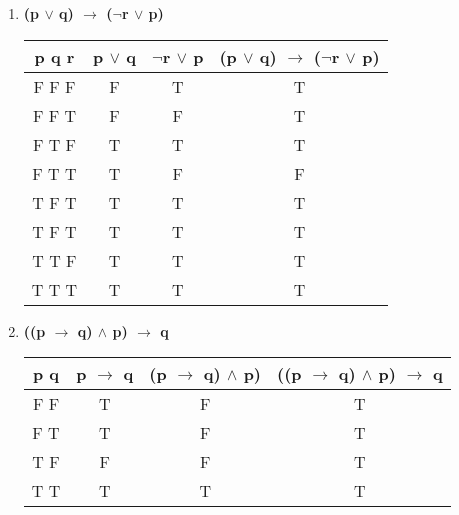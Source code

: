 \documentclass[11pt]{article}
\begin{document}
\begin{enumerate}
\begin{enumerate}[label=(\alph*)]
\item %
\textbf{(p $\lor$ q) $\to$ ($\lnot$r $\lor$ p)} \\
    \begin{tabular}{c|c|c|c}
        \textbf{p q r} & \textbf{p $\lor$ q} & \textbf{$\lnot$r $\lor$ p} & \textbf{(p $\lor$ q) $\to$ ($\lnot$r $\lor$ p)} \\
        \hline
        F F F & F & T & T \\
        F F T & F & F & T \\ 
        \hline
        F T F & T & T & T \\
        F T T & T & F & F \\
        \hline
        T F T & T & T & T \\
        T F T & T & T & T \\
        \hline
        T T F & T & T & T \\
        T T T & T & T & T \\
    \end{tabular}

\item %
\textbf{((p $\to$ q) $\land$ p) $\to$ q} \\
    \begin{tabular}{c|c|c|c}
        \textbf{p q} & \textbf{p $\to$ q} & \textbf{(p $\to$ q) $\land$ p)} & \textbf{((p $\to$ q) $\land$ p) $\to$ q} \\
        \hline
        F F & T & F & T \\
        F T & T & F & T \\
        \hline
        T F & F & F & T \\
        T T & T & T & T \\
    \end{tabular}
\end{enumerate}


\end{enumerate}
\end{document}
